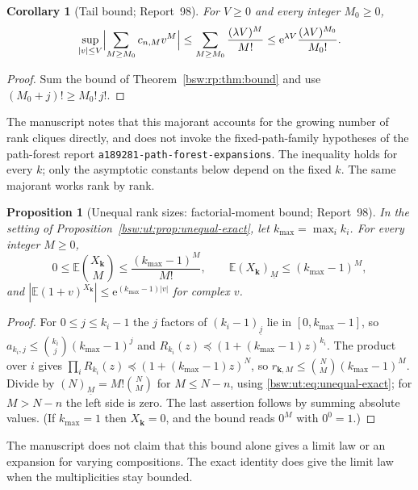 \documentclass[11pt,letterpaper]{article}
\newtheorem{proposition}[theorem]{Proposition}
\newtheorem{corollary}[theorem]{Corollary}
\theoremstyle{definition}
\theoremstyle{remark}
\newcommand{\EE}{\mathbb E}
\newcommand{\ee}{\mathrm e}
\newcommand{\fall}[2]{(#1)_{\underline{#2}}}
\begin{document}
\begin{corollary}[Tail bound; Report~98]\label{bsw:ut:cor:tail}
For $V\ge0$ and every integer $M_0\ge0$,
\begin{equation}\label{bsw:ut:eq:tail}
 \sup_{|v|\le V}\Bigl|\sum_{M\ge M_0}c_{n,M}v^M\Bigr|
 \le\sum_{M\ge M_0}\frac{(\lambda V)^M}{M!}
 \le\ee^{\lambda V}\frac{(\lambda V)^{M_0}}{M_0!}.
\end{equation}
\end{corollary}

\begin{proof}
Sum the bound of Theorem~\ref{bsw:rp:thm:bound} and use
$(M_0+j)!\ge M_0!\,j!$.
\end{proof}

The manuscript notes that this majorant accounts for the growing number of
rank cliques directly, and does not invoke the fixed-path-family hypotheses
of the path-forest report \texttt{a189281-\allowbreak path-\allowbreak forest-\allowbreak expansions}.  The
inequality holds for every $k$; only the asymptotic constants below depend
on the fixed $k$.  The same majorant works rank by rank.

\begin{proposition}[Unequal rank sizes: factorial-moment bound;
Report~98]\label{bsw:ut:prop:unequal}
In the setting of Proposition~\ref{bsw:ut:prop:unequal-exact}, let
$k_{\max}=\max_ik_i$.  For every integer $M\ge0$,
\begin{equation}\label{bsw:ut:eq:unequal}
 0\le\EE\binom{X_{\mathbf k}}M\le\frac{(k_{\max}-1)^M}{M!},
 \qquad\EE\fall{X_{\mathbf k}}M\le(k_{\max}-1)^M,
\end{equation}
and $|\EE(1+v)^{X_{\mathbf k}}|\le\ee^{(k_{\max}-1)|v|}$ for complex $v$.
\end{proposition}

\begin{proof}
For $0\le j\le k_i-1$ the $j$ factors of $\fall{k_i-1}j$ lie in
$[0,k_{\max}-1]$, so $a_{k_i,j}\le\binom{k_i}j(k_{\max}-1)^j$ and
$R_{k_i}(z)\preceq(1+(k_{\max}-1)z)^{k_i}$.  The product over $i$ gives
$\prod_iR_{k_i}(z)\preceq(1+(k_{\max}-1)z)^N$, so
$r_{\mathbf k,M}\le\binom NM(k_{\max}-1)^M$.  Divide by
$\fall NM=M!\binom NM$ for $M\le N-n$, using
\eqref{bsw:ut:eq:unequal-exact}; for $M>N-n$ the left side is zero.  The last
assertion follows by summing absolute values.  (If $k_{\max}=1$ then
$X_{\mathbf k}=0$, and the bound reads $0^M$ with $0^0=1$.)
\end{proof}

The manuscript does not claim that this bound alone gives a limit law or an
expansion for varying compositions.  The exact identity does give the limit
law when the multiplicities stay bounded.
\end{document}
